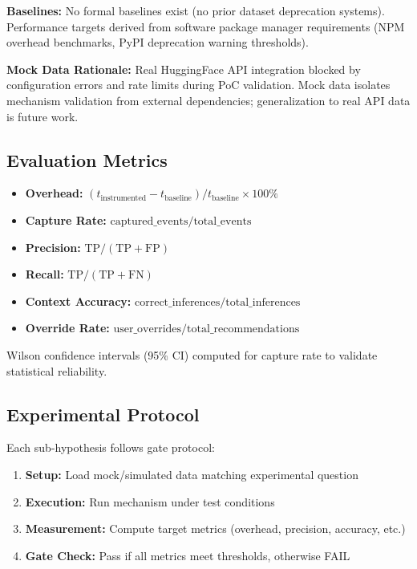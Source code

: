 \textbf{Baselines:} No formal baselines exist (no prior dataset deprecation systems). Performance targets derived from software package manager requirements (NPM overhead benchmarks, PyPI deprecation warning thresholds).

\textbf{Mock Data Rationale:} Real HuggingFace API integration blocked by configuration errors and rate limits during PoC validation. Mock data isolates mechanism validation from external dependencies; generalization to real API data is future work.

\subsection{Evaluation Metrics}

\begin{itemize}
\item \textbf{Overhead:} $(t_\text{instrumented} - t_\text{baseline}) / t_\text{baseline} \times 100\%$
\item \textbf{Capture Rate:} $\text{captured\_events} / \text{total\_events}$
\item \textbf{Precision:} $\text{TP} / (\text{TP} + \text{FP})$
\item \textbf{Recall:} $\text{TP} / (\text{TP} + \text{FN})$
\item \textbf{Context Accuracy:} $\text{correct\_inferences} / \text{total\_inferences}$
\item \textbf{Override Rate:} $\text{user\_overrides} / \text{total\_recommendations}$
\end{itemize}

Wilson confidence intervals (95\% CI) computed for capture rate to validate statistical reliability.

\subsection{Experimental Protocol}

Each sub-hypothesis follows gate protocol:
\begin{enumerate}
\item \textbf{Setup:} Load mock/simulated data matching experimental question
\item \textbf{Execution:} Run mechanism under test conditions
\item \textbf{Measurement:} Compute target metrics (overhead, precision, accuracy, etc.)
\item \textbf{Gate Check:} Pass if all metrics meet thresholds, otherwise FAIL
\end{enumerate}

